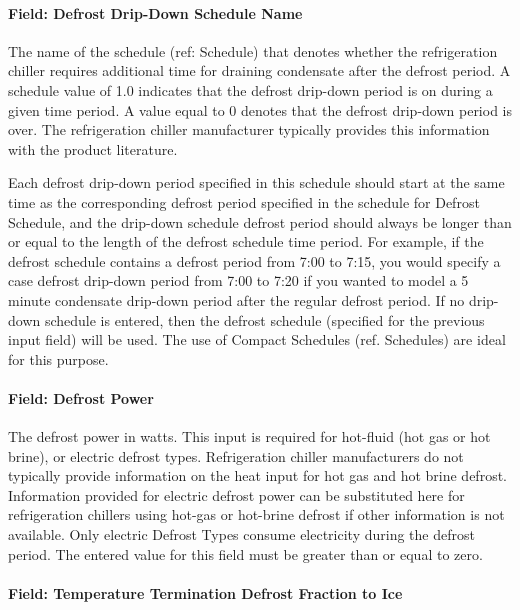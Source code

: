 \paragraph{Field: Defrost Drip-Down Schedule Name}\label{field-defrost-drip-down-schedule-name-1}

The name of the schedule (ref: Schedule) that denotes whether the refrigeration chiller requires additional time for draining condensate after the defrost period. A schedule value of 1.0 indicates that the defrost drip-down period is on during a given time period. A value equal to 0 denotes that the defrost drip-down period is over. The refrigeration chiller manufacturer typically provides this information with the product literature.

Each defrost drip-down period specified in this schedule should start at the same time as the corresponding defrost period specified in the schedule for Defrost Schedule, and the drip-down schedule defrost period should always be longer than or equal to the length of the defrost schedule time period. For example, if the defrost schedule contains a defrost period from 7:00 to 7:15, you would specify a case defrost drip-down period from 7:00 to 7:20 if you wanted to model a 5 minute condensate drip-down period after the regular defrost period. If no drip-down schedule is entered, then the defrost schedule (specified for the previous input field) will be used. The use of Compact Schedules (ref. Schedules) are ideal for this purpose.

\paragraph{Field: Defrost Power}\label{field-defrost-power-1}

The defrost power in watts. This input is required for hot-fluid (hot gas or hot brine), or electric defrost types. Refrigeration chiller manufacturers do not typically provide information on the heat input for hot gas and hot brine defrost. Information provided for electric defrost power can be substituted here for refrigeration chillers using hot-gas or hot-brine defrost if other information is not available. Only electric Defrost Types consume electricity during the defrost period. The entered value for this field must be greater than or equal to zero.

\paragraph{Field: Temperature Termination Defrost Fraction to Ice}\label{field-temperature-termination-defrost-fraction-to-ice-1}

